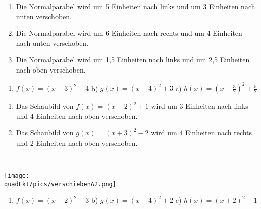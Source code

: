 \begin{Exercise}[title={Stelle jeweils die Funktionsgleichung auf und skizziere das Schaubild}, label=verschiebenA2]
	\begin{enumerate}[label=\alph*)]
		\item Die Normalparabel wird um 5 Einheiten nach links und um 3 Einheiten nach unten verschoben.
		\item Die Normalparabel wird um 6 Einheiten nach rechts und um 4 Einheiten nach unten verschoben.
		\item Die Normalparabel wird um 1,5 Einheiten nach links und um 2,5 Einheiten nach oben verschoben.
	\end{enumerate}
\end{Exercise}
\begin{Exercise}[title={Beschreibe wie man die Normalparabel verschieben muss und skizziere das Schaubild}, label=verschiebenA3]
	\begin{enumerate}[label=\alph*)]
		\item $f(x)=(x-3)^2-4$ \quad b) $g(x)=(x+4)^2+3$ \quad c) $h(x)=\left(x-\tfrac{3}{2}\right)^2+\tfrac{5}{2}$
	\end{enumerate}
\end{Exercise}
\begin{Exercise}[title={Stelle die Funktionsgleichung auf}, label=verschiebenA4]
	\begin{enumerate}[label=\alph*)]
		\item Das Schaubild von $f(x)=(x-2)^2+1$ wird um 3 Einheiten nach links und 4 Einheiten nach oben verschoben.
		\item Das Schaubild von $g(x)=(x+3)^2-2$ wird um 4 Einheiten nach rechts und 2 Einheiten nach oben verschoben.
	\end{enumerate}
\end{Exercise}\newpage
\begin{Answer}[ref=verschiebenA1]\\
	\begin{minipage}{\linewidth}\centering
		\texttt{[image: \\quadFkt/pics/verschiebenA2.png]}
	\end{minipage}\vspace{.1cm}
	\begin{enumerate}[label=\alph*)]
		\item $f(x)=\left(x-2\right)^2+3$ \quad b) $g(x)=\left(x+4\right)^2+2$ \quad c) $h(x)=\left(x+2\right)^2-1$
	\end{enumerate}
\end{Answer}

